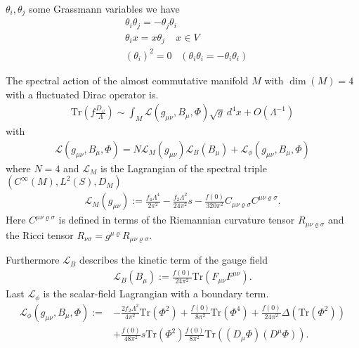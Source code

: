 $\theta _i, \theta _j$ some Grassmann variables we have
\begin{align}
    &\theta _i \theta _j = -\theta _j \theta _i \\
    &\theta _i x = x\theta _j \;\;\;\; x\in V \\
    &(\theta_i)^2 = 0 \;\;\; (\theta _i \theta _i = -\theta _i \theta _i)
\end{align}
\begin{proposition}
    The spectral action of the almost commutative manifold $M$ with $\dim(M)
    =4$ with a fluctuated Dirac operator is.
    \begin{align}
        \text{Tr}(f\frac{D_\omega}{\Lambda}) \sim \int_M \mathcal{L}(g_{\mu\nu},
         B_\mu, \Phi) \sqrt{g}\ d^4x + O(\Lambda^{-1})
    \end{align}
    with
    \begin{align}
        \mathcal{L}(g_{\mu\nu}, B_\mu, \Phi) =
        N\mathcal{L}_M(g_{\mu\nu})
        \mathcal{L}_B(B_\mu)+
        \mathcal{L}_\phi(g_{\mu\nu}, B_\mu, \Phi)
    \end{align}
    where $N=4$ and $\mathcal{L}_M$ is the Lagrangian of the spectral triple
    $(C^\infty(M) , L^2(S), D_M)$
    \begin{align}\label{lagr}
        \mathcal{L}_M(g_{\mu\nu}) := \frac{f_4 \Lambda ^4}{2\pi^2} -
        \frac{f_2 \Lambda^2}{24\pi ^2}s - \frac{f(0)}{320\pi^2} C_{\mu\nu
        \varrho \sigma}C^{\mu\nu \varrho \sigma}.
    \end{align}
    Here $C^{\mu\nu \varrho \sigma}$ is defined in terms of the Riemannian
    curvature tensor $R_{\mu\nu \varrho \sigma}$ and the Ricci tensor
    $R_{\nu\sigma} = g^{\mu\varrho} R_{\mu\nu \varrho\sigma}$.


    Furthermore $\mathcal{L}_B$ describes the kinetic term of the gauge field
    \begin{align}
        \mathcal{L}_B(B_\mu) := \frac{f(0)}{24\pi^2}
        \text{Tr}(F_{\mu\nu}F^{\mu\nu}).
    \end{align}
    Last $\mathcal{L}_\phi$ is the scalar-field Lagrangian with a boundary
    term.
    \begin{align}
        \mathcal{L}_\phi(g_{\mu\nu}, B_\mu, \Phi) :=
        &-\frac{2f_2\Lambda^2}{4\pi^2}\text{Tr}(\Phi^2) + \frac{f(0)}{8\pi^2}
        \text{Tr}(\Phi^4) + \frac{f(0)}{24\pi^2} \Delta(\text{Tr}(\Phi^2))\\
        &+ \frac{f(0)}{48\pi^2}s\text{Tr}(\Phi^2)
        \frac{f(0)}{8\pi^2}\text{Tr}((D_\mu \Phi)(D^\mu \Phi)).
    \end{align}
\end{proposition}
